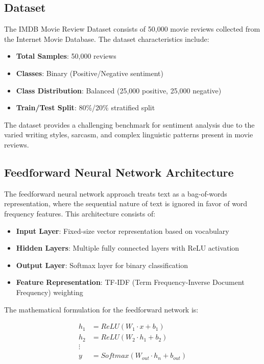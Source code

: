 \documentclass[a4paper, journal]{IEEEtran}
\begin{document}
\subsection{Dataset}

The IMDB Movie Review Dataset consists of 50,000 movie reviews collected from the Internet Movie Database. The dataset characteristics include:

\begin{itemize}
    \item \textbf{Total Samples}: 50,000 reviews
    \item \textbf{Classes}: Binary (Positive/Negative sentiment)
    \item \textbf{Class Distribution}: Balanced (25,000 positive, 25,000 negative)
    \item \textbf{Train/Test Split}: 80\%/20\% stratified split
\end{itemize}

The dataset provides a challenging benchmark for sentiment analysis due to the varied writing styles, sarcasm, and complex linguistic patterns present in movie reviews.

\subsection{Feedforward Neural Network Architecture}

The feedforward neural network approach treats text as a bag-of-words representation, where the sequential nature of text is ignored in favor of word frequency features. This architecture consists of:

\begin{itemize}
    \item \textbf{Input Layer}: Fixed-size vector representation based on vocabulary
    \item \textbf{Hidden Layers}: Multiple fully connected layers with ReLU activation
    \item \textbf{Output Layer}: Softmax layer for binary classification
    \item \textbf{Feature Representation}: TF-IDF (Term Frequency-Inverse Document Frequency) weighting
\end{itemize}

The mathematical formulation for the feedforward network is:

\begin{align}
h_1 &= ReLU(W_1 \cdot x + b_1) \\
h_2 &= ReLU(W_2 \cdot h_1 + b_2) \\
\vdots \\
y &= Softmax(W_{out} \cdot h_n + b_{out})
\end{align}
\end{document}
